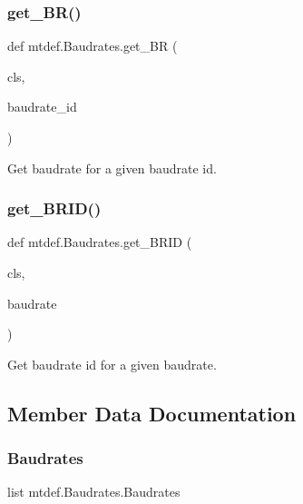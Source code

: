 \subsubsection{\texorpdfstring{get\+\_\+\+B\+R()}{get\_BR()}}
{\footnotesize\ttfamily def mtdef.\+Baudrates.\+get\+\_\+\+BR (\begin{DoxyParamCaption}\item[{}]{cls,  }\item[{}]{baudrate\+\_\+id }\end{DoxyParamCaption})}

\begin{DoxyVerb}Get baudrate for a given baudrate id.\end{DoxyVerb}
 \mbox{\label{classmtdef_1_1Baudrates_a32406f03907e8933f4216099b7a657a1}} 
\subsubsection{\texorpdfstring{get\+\_\+\+B\+R\+I\+D()}{get\_BRID()}}
{\footnotesize\ttfamily def mtdef.\+Baudrates.\+get\+\_\+\+B\+R\+ID (\begin{DoxyParamCaption}\item[{}]{cls,  }\item[{}]{baudrate }\end{DoxyParamCaption})}

\begin{DoxyVerb}Get baudrate id for a given baudrate.\end{DoxyVerb}
 

\subsection{Member Data Documentation}
\mbox{\label{classmtdef_1_1Baudrates_ad5d0122a011d49af285f6c1d94f11f8d}} 
\subsubsection{\texorpdfstring{Baudrates}{Baudrates}}
{\footnotesize\ttfamily list mtdef.\+Baudrates.\+Baudrates\hspace{0.3cm}{\ttfamily [static]}}

